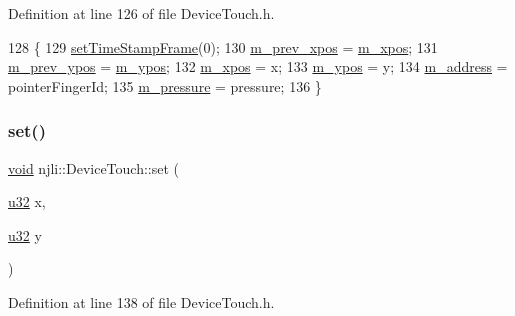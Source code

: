 Definition at line 126 of file Device\+Touch.\+h.


\begin{DoxyCode}
128     \{
129       \mbox{\hyperlink{classnjli_1_1_device_input_time_a03eca1e2b0725a5be925f6ec5cd33b7b}{setTimeStampFrame}}(0);
130       \mbox{\hyperlink{classnjli_1_1_device_touch_aefd5c83cec6edc7dcb7edeec2144c470}{m\_prev\_xpos}} = \mbox{\hyperlink{classnjli_1_1_device_touch_aa459469f52287f2085402117c13512f8}{m\_xpos}};
131       \mbox{\hyperlink{classnjli_1_1_device_touch_adc6f1bce3fa81e81f1a01ca55b2b3db7}{m\_prev\_ypos}} = \mbox{\hyperlink{classnjli_1_1_device_touch_aec3c40c2adb1ba1bf5a13bf366bd3b6d}{m\_ypos}};
132       \mbox{\hyperlink{classnjli_1_1_device_touch_aa459469f52287f2085402117c13512f8}{m\_xpos}} = x;
133       \mbox{\hyperlink{classnjli_1_1_device_touch_aec3c40c2adb1ba1bf5a13bf366bd3b6d}{m\_ypos}} = y;
134       \mbox{\hyperlink{classnjli_1_1_device_touch_adf8b9a7a96b90d0639aca0b9982a95d7}{m\_address}} = pointerFingerId;
135       \mbox{\hyperlink{classnjli_1_1_device_touch_a1fbc998f1460afc213b0ba31410599bd}{m\_pressure}} = pressure;
136     \}
\end{DoxyCode}
\mbox{\label{classnjli_1_1_device_touch_a82fca185d5e2b1378524b28db4fdd03e}} 
\subsubsection{\texorpdfstring{set()}{set()}\hspace{0.1cm}{\footnotesize\ttfamily [4/4]}}
{\footnotesize\ttfamily \mbox{\hyperlink{_thread_8h_af1e856da2e658414cb2456cb6f7ebc66}{void}} njli\+::\+Device\+Touch\+::set (\begin{DoxyParamCaption}\item[{\mbox{\hyperlink{_util_8h_a10e94b422ef0c20dcdec20d31a1f5049}{u32}}}]{x,  }\item[{\mbox{\hyperlink{_util_8h_a10e94b422ef0c20dcdec20d31a1f5049}{u32}}}]{y }\end{DoxyParamCaption})\hspace{0.3cm}{\ttfamily [inline]}}



Definition at line 138 of file Device\+Touch.\+h.


